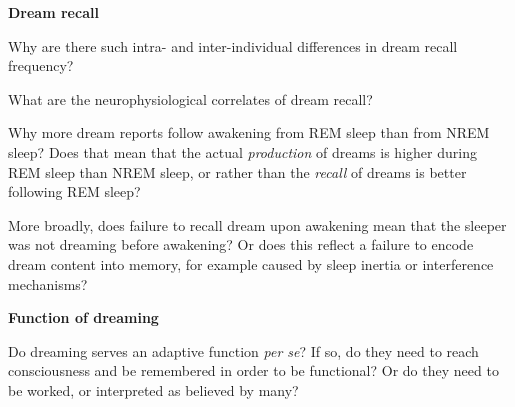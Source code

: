 \textbf{Dream recall}
\begin{my_list_item}
	\item Why are there such intra- and inter-individual differences in dream recall frequency?
	\item What are the neurophysiological correlates of dream recall?
    \item Why more dream reports follow awakening from REM sleep than from NREM sleep? Does that mean that the actual \emph{production} of dreams is higher during REM sleep than NREM sleep, or rather than the \emph{recall} of dreams is better following REM sleep?
	\item More broadly, does failure to recall dream upon awakening mean that the sleeper was not dreaming before awakening? Or does this reflect a failure to encode dream content into memory, for example caused by sleep inertia or interference mechanisms?
\end{my_list_item}

\textbf{Function of dreaming}
\begin{my_list_item}
	\item Do dreaming serves an adaptive function \emph{per se}? If so, do they need to reach consciousness and be remembered in order to be functional? Or do they need to be worked, or interpreted as believed by many?
\end{my_list_item}

